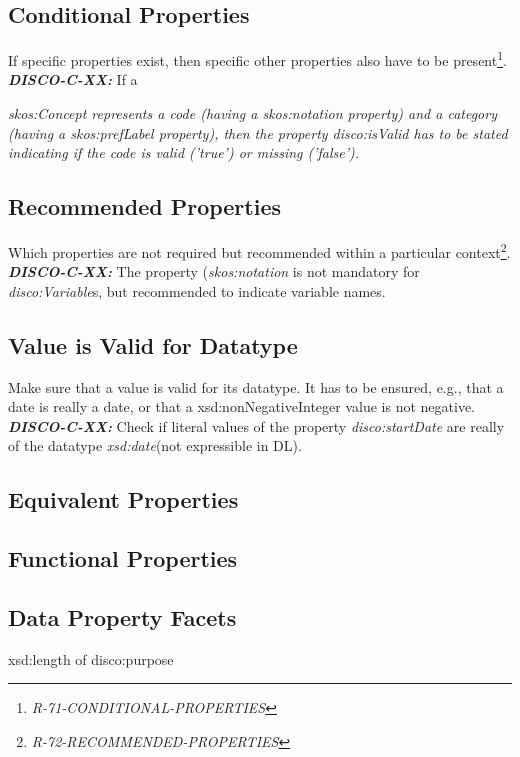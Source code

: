 \documentclass{elsart3p}    %
\begin{document}
\subsection{Conditional Properties}

If specific properties exist, then specific other properties also have to be present\footnote{{\em R-71-CONDITIONAL-PROPERTIES}}.
\textbf{{\em DISCO-C-XX:}}
If a {\em skos:Concept represents a code (having a {\em skos:notation} property) and a category (having a {\em skos:prefLabel} property), 
then the property {\em disco:isValid} has to be stated indicating if the code is valid ('true') or missing ('false').

\subsection{Recommended Properties}

Which properties are not required but recommended within a particular context\footnote{{\em R-72-RECOMMENDED-PROPERTIES}}.
\textbf{{\em DISCO-C-XX:}}
The property ({\em skos:notation} is not mandatory for {\em disco:Variable}s, but recommended to indicate variable names.

\subsection{Value is Valid for Datatype}

Make sure that a value is valid for its datatype.
It has to be ensured, e.g., that a date is really a date, or that a xsd:nonNegativeInteger value is not negative. 
\textbf{{\em DISCO-C-XX:}}
Check if literal values of the property {\em disco:startDate} are really of the datatype {\em xsd:date}(not expressible in DL).

\subsection{Equivalent Properties}

\subsection{Functional Properties}

\subsection{Data Property Facets}

xsd:length of disco:purpose

}
\end{document}
